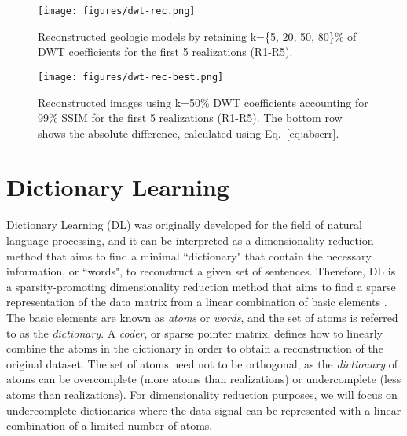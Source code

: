 \documentclass[a4paper,fleqn,12pt]{article}
\begin{document}
\begin{figure}[H]
    \centering
    \texttt{[image: figures/dwt-rec.png]}
    \caption{Reconstructed geologic models by retaining k=\{5, 20, 50, 80\}\% of DWT coefficients for the first 5 realizations (R1-R5).}
    \label{fig:dwt-rec}
\end{figure}

\begin{figure}[H]
    \centering
    \texttt{[image: figures/dwt-rec-best.png]}
    \caption{Reconstructed images using k=50\% DWT coefficients accounting for 99\% SSIM for the first 5 realizations (R1-R5). The bottom row shows the absolute difference, calculated using Eq.~\ref{eq:abserr}.}
    \label{fig:dwt-rec-best}
\end{figure}

\pagebreak
\section*{Dictionary Learning}
Dictionary Learning (DL) was originally developed for the field of natural language processing, and it can be interpreted as a dimensionality reduction method that aims to find a minimal ``dictionary" that contain the necessary information, or ``words", to reconstruct a given set of sentences. Therefore, DL is a sparsity-promoting dimensionality reduction method that aims to find a sparse representation of the data matrix from a linear combination of basic elements \cite{tovsic2011dictionary, mairal2008supervised}. The basic elements are known as \emph{atoms} or \emph{words}, and the set of atoms is referred to as the \emph{dictionary}. A \emph{coder}, or sparse pointer matrix, defines how to linearly combine the atoms in the dictionary in order to obtain a reconstruction of the original dataset. The set of atoms need not to be orthogonal, as the \emph{dictionary} of atoms can be overcomplete (more atoms than realizations) or undercomplete (less atoms than realizations). For dimensionality reduction purposes, we will focus on undercomplete dictionaries where the data signal can be represented with a linear combination of a limited number of atoms.
\end{document}

